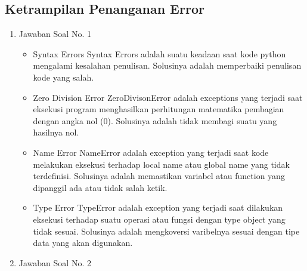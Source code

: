 \subsection{Ketrampilan Penanganan Error}
\begin{enumerate}
\item Jawaban Soal No. 1
\begin{itemize}
\item Syntax Errors
Syntax Errors adalah suatu keadaan saat kode python mengalami kesalahan penulisan. Solusinya adalah memperbaiki penulisan kode yang salah.

\item Zero Division Error
ZeroDivisonError adalah exceptions yang terjadi saat eksekusi program menghasilkan perhitungan matematika pembagian dengan angka nol (0). Solusinya adalah tidak membagi suatu yang hasilnya nol.

\item Name Error
NameError adalah exception yang terjadi saat kode melakukan eksekusi terhadap local name atau global name yang tidak terdefinisi. Solusinya adalah memastikan variabel atau function yang dipanggil ada atau tidak salah ketik.

\item Type Error
TypeError adalah exception yang terjadi saat dilakukan eksekusi terhadap suatu operasi atau fungsi dengan type object yang tidak sesuai. Solusinya adalah mengkoversi varibelnya sesuai dengan tipe data yang akan digunakan.

\end{itemize}

\item Jawaban Soal No. 2																			

\end{enumerate}


